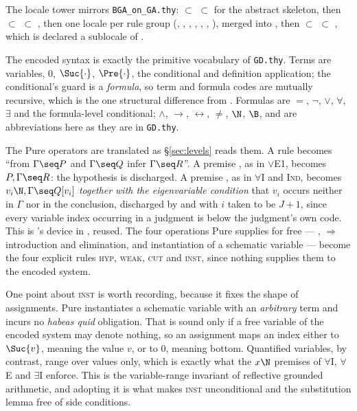 \noindent
The locale tower mirrors \texttt{BGA\_on\_GA.thy}:
 $\subset$  $\subset$
 for the abstract skeleton, then
 $\subset$  $\subset$ , then
one locale per rule group
(, , ,
, , ,
), merged into , then
 $\subset$  $\subset$
, which is declared a sublocale of .

The encoded syntax is exactly the primitive vocabulary of \texttt{GD.thy}.
Terms are variables, $0$, $\Suc{\cdot}$, $\Pre{\cdot}$, the conditional and
definition application; the conditional's guard is a \emph{formula}, so term and
formula codes are mutually recursive, which is the one structural difference
from \BGA.  Formulas are $=$, $\neg$, $\vee$, $\forall$, $\exists$ and the
formula-level conditional; $\wedge$, $\longrightarrow$, $\longleftrightarrow$,
$\neq$, $\N$, $\B$,  and  are abbreviations here as they are
in \texttt{GD.thy}.

The Pure operators are translated as \S\ref{sec:levels} reads them.  A rule
 becomes ``from $\Gamma \seq P$ and $\Gamma \seq Q$ infer
$\Gamma \seq R$''.  A premise , as in $\vee$E1, becomes
$P, \Gamma \seq R$: the hypothesis is discharged.  A premise
, as in $\forall$I and \textsc{Ind}, becomes
$v_i \N, \Gamma \seq Q[v_i]$ \emph{together with the eigenvariable condition}
that $v_i$ occurs neither in $\Gamma$ nor in the conclusion, discharged by
 and  with $i$ taken to
be $J + 1$, since every variable index occurring in a judgment is below the
judgment's own code.  This is \BGA's device in , reused.  The
four operations Pure supplies for free --- , $\Longrightarrow$
introduction and elimination, and instantiation of a schematic variable ---
become the four explicit rules \textsc{hyp}, \textsc{weak}, \textsc{cut} and
\textsc{inst}, since nothing supplies them to the encoded system.

One point about \textsc{inst} is worth recording, because it fixes the shape of
assignments.  Pure instantiates a schematic variable with an \emph{arbitrary}
term and incurs no \emph{habeas quid} obligation.  That is sound only if a free
variable of the encoded system may denote nothing, so an assignment maps an
index either to $\Suc{v}$, meaning the value $v$, or to $0$, meaning bottom.
Quantified variables, by contrast, range over values only, which is exactly what
the $x \N$ premises of $\forall$I, $\forall$E and $\exists$I enforce.  This is
the variable-range invariant of reflective grounded arithmetic, and adopting it
is what makes \textsc{inst} unconditional and the substitution lemma free of
side conditions.

